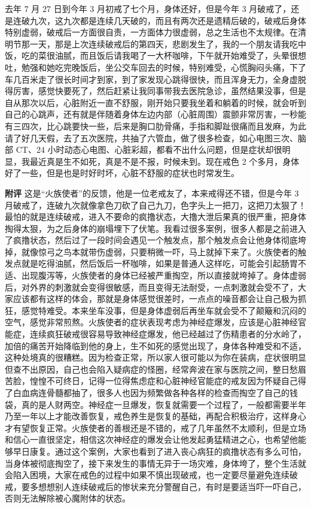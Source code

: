 \begin{case}
    去年 7 月 27 日到今年 3 月初戒了七个月，身体还好，但是今年 3 月破戒了，还是连破九次，这九次都是连续几天破的，而且有两次还是遗精后破的，破戒后身体特别虚弱，破戒后一方面很自责，一方面体力很虚弱，总之生活也不太规律。在清明节那一天，那是上次连续破戒后的第四天，悲剧发生了，我的一个朋友请我吃中饭，吃的菜很油腻，而且饭后请我喝了一大杯咖啡，下午就开始难受了，头晕很想吐，勉强和她吃完晚饭后，坐公交车回去的时候，特别难受，心慌胸闷头痛，下了车几百米走了很长时间才到家，到了家发现心跳得很快，而且浑身无力，全身虚脱得厉害，感觉快要死了，然后赶紧让我同事带我去医院急诊，虽然结果没事，但是自从那次以后，心脏附近一直不舒服，刚开始只要我坐着和躺着的时候，就会听到自己的心跳声，还有就是伴随着身体左边内部（心脏周围）震颤非常厉害，一秒能有三四次，比心跳要快一些，后来是胸口肋骨痛，手指和脚趾很痛而且发麻，为此请了好几天假，去了五次医院，共抽了六管血，做了很多检查，如心电图三次、脑部 CT、24 小时动态心电图、心脏彩超，都看不出什么问题，但是症状却很明显，我最近真是生不如死，真是不是不报，时候未到。现在戒色 2 个多月，身体好了一些，但是也是时好时坏，心脏不舒服的症状也时常发生。

    \textbf{附评} 这是“火族使者”的反馈，他是一位老戒友了，本来戒得还不错，但是今年 3 月破戒了，连破九次就像拿色刀砍了自己九刀，色字头上一把刀，这把刀太狠了！最怕的就是连续破戒，进入不要命的疯撸状态，大撸大泄后果真的很严重，把身体掏得太狠，为之后身体的崩塌埋下了伏笔。我看过很多案例，很多人都是之前进入了疯撸状态，然后过了一段时间会遇见一个触发点，那个触发点会让他身体彻底垮掉，就像惊弓之鸟本就带伤虚弱，只要稍微一吓，马上就掉下来了。火族使者的触发点就是吃得油腻，然后饭后一杯咖啡，如果是普通人这样吃，可能会引起肠胃不适、出现腹泻等，火族使者的身体已经被严重掏空，所以直接就垮掉了。身体虚弱后，对外界的刺激就会变得很敏感，而且变得无法耐受，一点刺激就会受不了，大家应该都有这样的体会，那就是身体感觉很差时，一点点的噪音都会让自己极为抓狂，感觉特难受。本来坐车没事，但是身体虚弱后再坐车就会受不了颠簸和沉闷的空气，感觉非常煎熬。火族使者的症状表现考虑为神经症爆发，应该是心脏神经官能症，连续疯狂破戒很容易导致神经症爆发，他已经越过了伤精患者的分水岭了，加倍的痛苦开始降临到他的身上，生不如死的感觉出现了，身体各种难受和不适，这种处境真的很糟糕。因为检查正常，所以家人很可能以为你在装病，症状很明显但查不出原因，自己也会陷入疑病症的怪圈，经常奔波在家与医院之间，整日愁眉苦脸，惶惶不可终日，记得一位得焦虑症和心脏神经官能症的戒友因为怀疑自己得了白血病连骨髓都抽了，很多人也因为频繁做各种各样的检查而掏空了自己的钱袋，真的是人财两空。神经症一旦爆发，恢复就需要一个过程了，一般都需要半年乃至一年以上才能改善恢复，戒色养生是恢复的基础，再配合积极治疗，这样身心才有望恢复正常。火族使者的善根还是不错的，戒了几年虽然不太顺利，但是立场和信心一直很坚定，相信这次神经症的爆发会让他发起勇猛精进之心，也希望他能够早日康复。通过这个案例，大家也看到了进入丧心病狂的疯撸状态有多么可怕，当身体被彻底掏空了，接下来发生的事情无异于一场灾难，身体垮了，整个生活就会陷入困境，大家在戒色的过程中如果不慎出现破戒，也一定要尽量避免连续破戒，要多想想别人连续破戒后的惨状来充分警醒自己，有时是要适当吓一吓自己，否则无法解除被心魔附体的状态。
\end{case}

